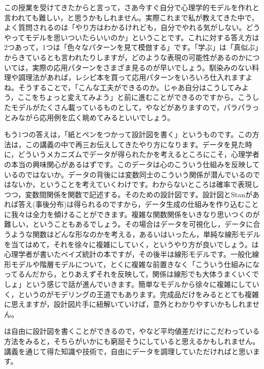 \documentclass{ltjsbook}
\begin{document}
この授業を受けてきたからと言って，さあ今すぐ自分で心理学的モデルを作れと言われても難しい，と思うかもしれません。実際これまで私が教えてきた中で，よく質問されるのは「やり方はわかるけれども，自分でやれる気がしない。どうやってモデルを思いついたらいいのか」ということです。これに対する答え方は2つあって，1つは「色々なパターンを見て模倣する」です。「学ぶ」は「真似ぶ」からきているとも言われたりしますが，どのような表現の可能性があるのかについては，実際の応用パターンをさまざま見るのが早いでしょう。馴染みのない料理や調理法があれば，レシピ本を買って応用パターンをいろいろ仕入れますよね。そうすることで，「こんな工夫ができるのか。じゃあ自分はこうしてみよう，ここをちょっと変えてみよう」と前に進むことができるのですから。こうしたモデルがたくさん載っているものとして，\textcite{Lee201709}や\textcite{Toyoda2017,Tanobei2018,Tanobei2019}などがありますので，パラパラっとみながら応用例を広く眺めてみるといいでしょう。

もう1つの答えは，「紙とペンをつかって設計図を書く」というものです。この方法は，この講義の中で再三お伝えしてきたやり方になります。データを見た時に，どういうメカニズムでデータが得られたかを考えるところにこそ，心理学者の本当の興味関心があるはずです。このデータは心のこういう仕組みを反映しているのではないか。データの背後には変数同士のこういう関係が潜んでいるのではないか，ということを考えていくわけです。わからないところは確率で表現しつつ，変数間関係を関数で記述する。そのための設計図です。設計図とStanがあれば答え(事後分布)は得られるのですから，データ生成の仕組みを作り込むことに我々は全力を傾けることができます。複雑な関数関係をいきなり思いつくのが難しい，ということもあるでしょう。その場合はデータを可視化し，データに合うような関数はどんな形なのかを考える，あるいはいったん，単純な線形モデルを当てはめて，それを徐々に複雑にしていく，というやり方が良いでしょう。\textcite{Maeda2017}は心理学者が書いたベイズ統計の本ですが，その後半は線形モデルです。一般化線形モデルや階層モデルについて，とくに複雑な前置きなく「こういう仕組みになってるんだから，とりあえずそれを反映して，関係は線形でも大体うまくいくでしょ」という感じで話が進んでいきます。簡単なモデルから徐々に複雑にしていく，というのがモデリングの王道でもあります。完成品だけをみるととても複雑に思えますが，設計図片手に紐解いていけば，意外とわかりやすいかもしれません。

は自由に設計図を書くことができるので，やなど平均値差だけにこだわっている方法をみると，そちらがいかにも窮屈そうにしていると思えるかもしれません。講義を通じて得た知識や技術で，自由にデータを調理していただければと思います。
\end{document}
